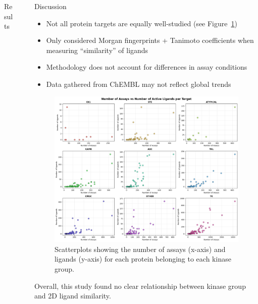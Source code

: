 \documentclass[final]{beamer}
\newlength{\sepwidth}
\newlength{\colwidth}
\newcommand{\separatorcolumn}{\begin{column}{\sepwidth}\end{column}}
\begin{document}
\begin{frame}[t]
\begin{columns}[t]
\begin{column}{\colwidth}
\begin{block}{Results}
  \end{block}

\end{column}

\separatorcolumn

\begin{column}{\colwidth} 
  \begin{block}{Discussion}
    \small
    \begin{itemize}
        \item Not all protein targets are equally well-studied (see Figure~\ref{assay_vs_ligand_plot})
        \item Only considered Morgan fingerprints + Tanimoto coefficients when measuring ``similarity'' of ligands
        \item Methodology does not account for differences in assay conditions
        \item Data gathered from ChEMBL may not reflect global trends
    \end{itemize}

    \begin{figure}
        \centering
        \includegraphics[width=\textwidth]{../figures/assay_vs_ligand.png}
        \caption{Scatterplots showing the number of assays (x-axis) and ligands (y-axis) for each protein belonging to each kinase group.}
        \label{assay_vs_ligand_plot}
    \end{figure}

      \small
      Overall, this study found no clear relationship between kinase group and 2D ligand similarity.
  \end{block}


\end{column}
\end{columns}
\end{frame}
\end{document}
